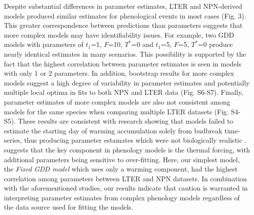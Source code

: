 \documentclass[fleqn,12pt,lineno]{article}
\begin{document}
Despite substantial differences in parameter estimates, LTER and NPN-derived models produced similar estimates for phenological events in most cases (Fig. 3). This greater correspondence between predictions than parameters suggests that more complex models may have identifiability issues. For example, two GDD models with parameters of $t_{1}$=1, $F$=10, $T^*$=0 and $t_{1}$=5, $F$=5, $T^*$=0 produce nearly identical estimates in many scenarios. This possibility is supported by the fact that the highest correlation between parameter estimates is seen in models with only 1 or 2 parameters. In addition, bootstrap results for more complex models suggest a high degree of variability in parameter estimates and potentially multiple local optima in fits to both NPN and LTER data (Fig. S6-S7). Finally, parameter estimates of more complex models are also not consistent among models for the same species when comparing multiple LTER datasets (Fig. S4-S5). These results are consistent with research showing that models failed to estimate the starting day of warming accumulation solely from budbreak time-series, thus producing parameter estamates which were not biologically realistic \citep{chuine2016}. \cite{basler2016} suggests that the key component in phenology models is the thermal forcing, with additional parameters being sensitive to over-fitting. Here, our simplest model, the \textit{Fixed GDD model} which uses only a warming component, had the highest correlation among parameters between LTER and NPN datasets. In combination with the aforementioned studies, our results indicate that caution is warranted in interpreting parameter estimates from complex phenology models regardless of the data source used for fitting the models.
\end{document}
